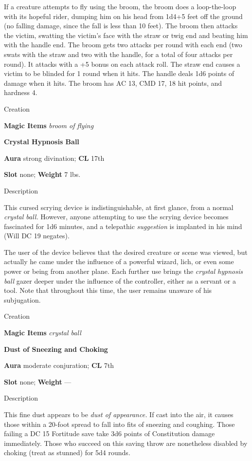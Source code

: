 If a creature attempts to fly using the broom, the broom does a loop-the-loop with its hopeful rider, dumping him on his head from 1d4+5 feet off the ground (no falling damage, since the fall is less than 10 feet). The broom then attacks the victim, swatting the victim's face with the straw or twig end and beating him with the handle end. The broom gets two attacks per round with each end (two swats with the straw and two with the handle, for a total of four attacks per round). It attacks with a +5 bonus on each attack roll. The straw end causes a victim to be blinded for 1 round when it hits. The handle deals 1d6 points of damage when it hits. The broom has AC 13, CMD 17, 18 hit points, and hardness 4. 
				
Creation
				
\textbf{Magic Items}\textit{ broom of flying}
				
\textbf{Crystal Hypnosis Ball}
				
\textbf{Aura} strong divination; \textbf{CL} 17th
				
\textbf{Slot} none; \textbf{Weight }7 lbs.
				
Description
				
This cursed scrying device is indistinguishable, at first glance, from a normal \textit{crystal ball. }However, anyone attempting to use the scrying device becomes fascinated for 1d6 minutes, and a telepathic \textit{suggestion }is implanted in his mind (Will DC 19 negates).
				
The user of the device believes that the desired creature or scene was viewed, but actually he came under the influence of a powerful wizard, lich, or even some power or being from another plane. Each further use brings the \textit{crystal hypnosis ball} gazer deeper under the influence of the controller, either as a servant or a tool. Note that throughout this time, the user remains unaware of his subjugation. 
				
Creation
				
\textbf{Magic Items}\textit{ crystal ball}
				
\textbf{Dust of Sneezing and Choking}
				
\textbf{Aura} moderate conjuration; \textbf{CL} 7th
				
\textbf{Slot} none; \textbf{Weight }---
				
Description
				
This fine dust appears to be \textit{dust of appearance. }If cast into the air, it causes those within a 20-foot spread to fall into fits of sneezing and coughing. Those failing a DC 15 Fortitude save take 3d6 points of Constitution damage immediately. Those who succeed on this saving throw are nonetheless disabled by choking (treat as stunned) for 5d4 rounds. 
				
